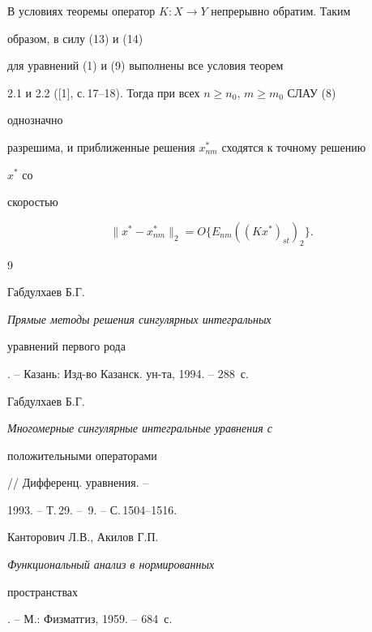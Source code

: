 В условиях теоремы оператор $K:X\to Y$ непрерывно обратим. Таким  


образом, в силу (13) и (14) 


для уравнений (1) и (9) выполнены все условия теорем  


2.1 и 2.2 ([1], с.\,17--18). Тогда при всех $n\ge n_0$, $m\ge m_0$ СЛАУ (8) 


однозначно  


разрешима, и приближенные решения $x^*_{nm}$ сходятся к точному решению 


$x^*$ со  


скоростью 


$$ 


\|x^*-x^*_{nm}\|_2=O\{E_{nm}((Kx^*)_{st})_2\}. 


$$ 


 


 


\begin{thebibliography}{9} 


 




Габдулхаев Б.Г. {\em Прямые методы решения сингулярных интегральных  


уравнений первого рода}. -- Казань: Изд-во Казанск. ун-та, 1994. -- 288~с. 




Габдулхаев Б.Г. {\em Многомерные сингулярные интегральные уравнения с  


положительными операторами} // Дифференц. уравнения. -- 


1993. -- Т.\,29. -- \No\,9. -- С.\,1504--1516. 




Канторович Л.В., Акилов Г.П. {\em Функциональный анализ в нормированных  


пространствах}. -- М.: Физматгиз, 1959. -- 684~с. 


 


 


\end{thebibliography} 


 


\vskip 2cm 


 






 


\label{end} 


 


 


